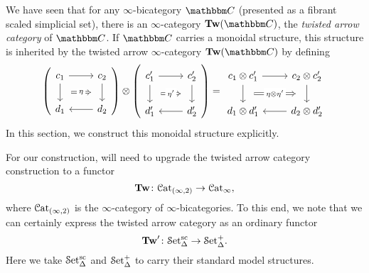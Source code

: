 \documentclass[main.tex]{subfiles}
\begin{document}
We have seen that for any $\infty$-bicategory $\CC$ (presented as a fibrant scaled simplicial set), there is an $\infty$-category $\Tw(\CC)$, the \emph{twisted arrow category} of $\CC$. If $\CC$ carries a monoidal structure, this structure is inherited by the twisted arrow $\infty$-category $\Tw(\CC)$ by defining
\begin{equation*}
  \left(
  \begin{tikzcd}
    c_{1}
    \arrow[r]
    \arrow[d, ""{name=L}]
    & c_{2}
    \arrow[d, ""{name=R, swap}]
    \\
    d_{1}
    & d_{2}
    \arrow[l]
    \arrow[from=L, to=R, Rightarrow, shorten=1.5ex, "\eta"{description}]
  \end{tikzcd}
  \right) \otimes \left(
  \begin{tikzcd}
    c_{1}'
    \arrow[r]
    \arrow[d, ""{name=L}]
    & c_{2}'
    \arrow[d, ""{name=R, swap}]
    \\
    d_{1}'
    & d_{2}'
    \arrow[l]
    \arrow[from=L, to=R, Rightarrow, shorten=1.5ex, "\eta'"{description}]
  \end{tikzcd}
  \right)
  =
  \begin{tikzcd}
    c_{1} \otimes c_{1}'
    \arrow[r]
    \arrow[d, ""{name=L}]
    & c_{2} \otimes c_{2}'
    \arrow[d, ""{name=R, swap}]
    \\
    d_{1} \otimes d_{1}'
    & d_{2} \otimes d_{2}'
    \arrow[l]
    \arrow[from=L, to=R, Rightarrow, shorten=1.5ex, "\eta \otimes \eta'"{description}]
  \end{tikzcd}
\end{equation*}
In this section, we construct this monoidal structure explicitly. 

For our construction, will need to upgrade the twisted arrow category construction to a functor 
\begin{equation*}
  \mathbf{Tw}\colon \mathcal{C}\mathrm{at}_{(\infty,2)} \to \mathcal{C}\mathrm{at}_{\infty},
\end{equation*}
where $\mathcal{C}\mathrm{at}_{(\infty,2)}$ is the $\infty$-category of $\infty$-bicategories. To this end, we note that we can certainly express the twisted arrow category as an ordinary functor
\begin{equation*}
  \mathbf{Tw}'\colon \mathcal{S}\mathrm{et}_{\Delta}^{\mathrm{sc}} \to \mathcal{S}\mathrm{et}_{\Delta}^{+}.
\end{equation*}
Here we take $\mathcal{S}\mathrm{et}_{\Delta}^{\mathrm{sc}}$ and $\mathcal{S}\mathrm{et}_{\Delta}^{+}$ to carry their standard model structures.
\end{document}
